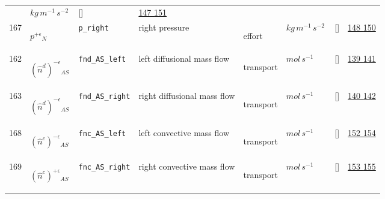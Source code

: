 \begin{longtable}{|p{1cm}|p{3cm}|p{3cm}|p{7cm}|p{3.0cm}|p{3cm}|p{2cm}|p{1cm}|}
             & $ kg \,m^{-1} \,s^{-2} \, $
             & []
             & \hyperlink{"e:147"}{ 147 }
                 \hyperlink{"e:151"}{ 151 }
                 \\
    167
             & \hypertarget{"v:167"}{ $ {{p^{+\epsilon}}}{_{N}} $}
             & \verb|p_right|
             & right pressure
             & \begin{lay}effort \end{lay}
             & $ kg \,m^{-1} \,s^{-2} \, $
             & []
             & \hyperlink{"e:148"}{ 148 }
                 \hyperlink{"e:150"}{ 150 }
                 \\
    162
             & \hypertarget{"v:162"}{ $ {\left(\hat{n}^{d}\right)^{-\epsilon}}{_{{A S}}} $}
             & \verb|fnd_AS_left|
             & left diffusional mass flow
             & \begin{lay}transport \end{lay}
             & $ mol \,s^{-1} \, $
             & []
             & \hyperlink{"e:139"}{ 139 }
                 \hyperlink{"e:141"}{ 141 }
                 \\
    163
             & \hypertarget{"v:163"}{ $ {\left(\hat{n}^{d}\right)^{-\epsilon}}{_{{A S}}} $}
             & \verb|fnd_AS_right|
             & right diffusional mass flow
             & \begin{lay}transport \end{lay}
             & $ mol \,s^{-1} \, $
             & []
             & \hyperlink{"e:140"}{ 140 }
                 \hyperlink{"e:142"}{ 142 }
                 \\
    168
             & \hypertarget{"v:168"}{ $ {\left(\hat{n}^{c}\right)^{-\epsilon}}{_{{A S}}} $}
             & \verb|fnc_AS_left|
             & left convective mass flow
             & \begin{lay}transport \end{lay}
             & $ mol \,s^{-1} \, $
             & []
             & \hyperlink{"e:152"}{ 152 }
                 \hyperlink{"e:154"}{ 154 }
                 \\
    169
             & \hypertarget{"v:169"}{ $ {\left(\hat{n}^{c}\right)^{+\epsilon}}{_{{A S}}} $}
             & \verb|fnc_AS_right|
             & right convective mass flow
             & \begin{lay}transport \end{lay}
             & $ mol \,s^{-1} \, $
             & []
             & \hyperlink{"e:153"}{ 153 }
                 \hyperlink{"e:155"}{ 155 }
                 \\
    \end{longtable}